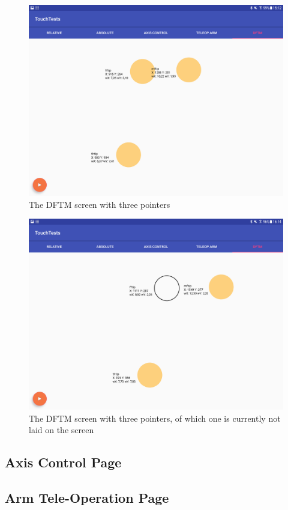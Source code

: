 \begin{figure}
	\caption{\label{fig:ui:dfmt}The DFTM screen with three pointers}
	\includegraphics[width=0.9\linewidth]{assets/chpt_impl/dftm}
\end{figure}

\begin{figure}
	\caption{\label{fig:ui:dfmt_lift}The DFTM screen with three pointers, of which one is currently not laid on the screen}
	\includegraphics[width=0.9\linewidth]{assets/chpt_impl/dftm_lifted}
\end{figure}

\subsection{Axis Control Page}

\subsection{Arm Tele-Operation Page}
\label{sec:impl:armteleop}

